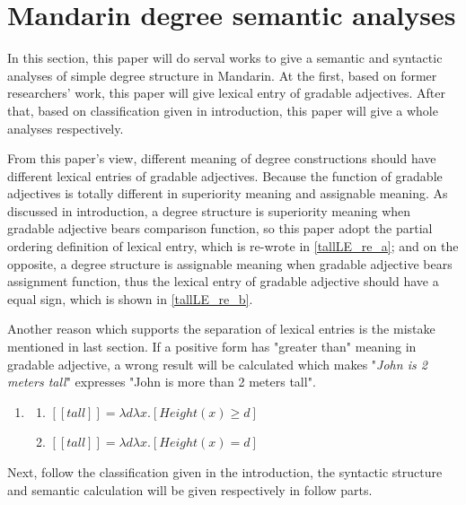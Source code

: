 \documentclass{ctexart}
\begin{document}
\section{Mandarin degree semantic analyses}

In this section, this paper will do serval works to give a semantic and syntactic analyses of simple degree structure in Mandarin. At the first, based on former researchers' work, this paper will give lexical entry of gradable adjectives. After that, based on classification given in introduction, this paper will give a whole analyses respectively.

From this paper's view, different meaning of degree constructions should have different lexical entries of gradable adjectives. Because the function of gradable adjectives is totally different in superiority meaning and assignable meaning. As discussed in introduction, a degree structure is superiority meaning when gradable adjective bears comparison function, so this paper adopt the partial ordering definition of lexical entry, which is re-wrote in \ref{tallLE_re_a}; and on the opposite, a degree structure is assignable meaning when gradable adjective bears assignment function, thus the lexical entry of gradable adjective should have a equal sign, which is shown in \ref{tallLE_re_b}.

Another reason which supports the separation of lexical entries is the mistake mentioned in last section. If a positive form has "greater than" meaning in gradable adjective, a wrong result will be calculated which makes "\textit{John is 2 meters tall}" expresses "John is more than 2 meters tall".

\begin{enumerate}[resume]
    \item \label{tallLE_re}
    
    \begin{enumerate}[ref=(\arabic{enumi}\alph*)]
        \item \label{tallLE_re_a} 
        $[\![tall]\!]=\lambda d \lambda x.[Height(x) \geq d]$
    
        \item \label{tallLE_re_b} 
        $[\![tall]\!]=\lambda d \lambda x.[Height(x) = d]$
    
    \end{enumerate}
\end{enumerate}

Next, follow the classification given in the introduction, the syntactic structure and semantic calculation will be given respectively in follow parts.
\end{document}
